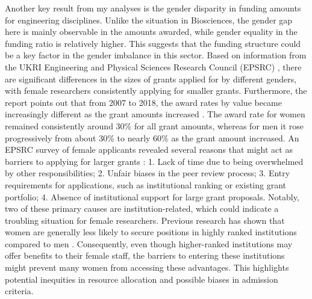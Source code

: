 Another key result from my analyses is the gender disparity in funding amounts for engineering disciplines. Unlike the situation in Biosciences, the gender gap here is mainly observable in the amounts awarded, while gender equality in the funding ratio is relatively higher. This suggests that the funding structure could be a key factor in the gender imbalance in this sector. Based on information from the UKRI Engineering and Physical Sciences Research Council (EPSRC) \cite{UKRIengineering}, there are significant differences in the sizes of grants applied for by different genders, with female researchers consistently applying for smaller grants. Furthermore, the report points out that from 2007 to 2018, the award rates by value became increasingly different as the grant amounts increased \cite{UKRIengineering}. The award rate for women remained consistently around 30\% for all grant amounts, whereas for men it rose progressively from about 30\% to nearly 60\% as the grant amount increased. An EPSRC survey of female applicants revealed several reasons that might act as barriers to applying for larger grants \cite{UKRIsurvey}: 1. Lack of time due to being overwhelmed by other responsibilities; 2. Unfair biases in the peer review process; 3. Entry requirements for applications, such as institutional ranking or existing grant portfolio; 4. Absence of institutional support for large grant proposals. Notably, two of these primary causes are institution-related, which could indicate a troubling situation for female researchers. Previous research has shown that women are generally less likely to secure positions in highly ranked institutions compared to men \cite{gender_science}. Consequently, even though higher-ranked institutions may offer benefits to their female staff, the barriers to entering these institutions might prevent many women from accessing these advantages. This highlights potential inequities in resource allocation and possible biases in admission criteria.\\

